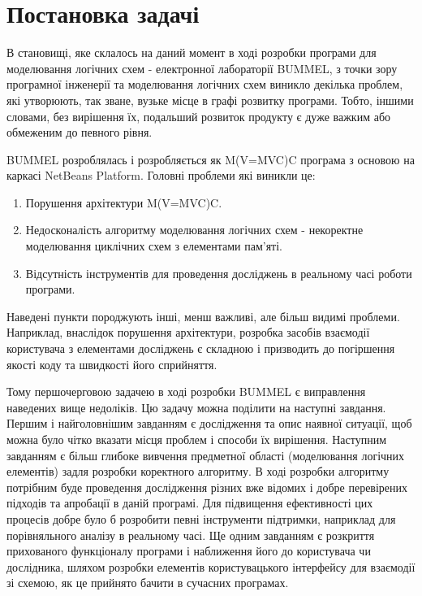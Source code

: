 \documentclass[12pt,a4paper]{article}
\begin{document}
\clearpage

\section{Постановка задачі}

В становищі, яке склалось на даний момент в ході розробки програми для моделювання логічних схем - електронної лабораторії BUMMEL, з точки зору програмної інженерії та моделювання логічних схем виникло декілька проблем, які утворюють, так зване, вузьке місце в графі розвитку програми. Тобто, іншими словами, без вирішення їх, подальший розвиток продукту є дуже важким або обмеженим до певного рівня.

BUMMEL розроблялась і розробляється як M(V=MVC)C програма з основою на каркасі NetBeans Platform. Головні проблеми які виникли це:
\begin{enumerate}
  \item Порушення архітектури M(V=MVC)C.
  \item Недосконалість алгоритму моделювання логічних схем - некоректне моделювання циклічних схем з елементами пам’яті.
  \item Відсутність інструментів для проведення досліджень в реальному часі роботи програми.
\end{enumerate}

Наведені пункти породжують інші, менш важливі, але більш видимі проблеми. Наприклад, внаслідок порушення архітектури, розробка засобів взаємодії користувача з елементами досліджень є складною і призводить до погіршення якості коду та швидкості його сприйняття.

Тому першочерговою задачею в ході розробки BUMMEL є виправлення наведених вище недоліків. Цю задачу можна поділити на наступні завдання. Першим і найголовнішим завданням є дослідження та опис наявної ситуації, щоб можна було чітко вказати місця проблем і способи їх вирішення. Наступним завданням є більш глибоке вивчення предметної області (моделювання логічних елементів) задля розробки коректного алгоритму. В ході розробки алгоритму потрібним буде проведення дослідження різних вже відомих і добре перевірених підходів та апробації в даній програмі. Для підвищення ефективності цих процесів добре було б розробити певні інструменти підтримки, наприклад для порівняльного аналізу в реальному часі. Ще одним завданням є розкриття прихованого функціоналу програми і наближення його до користувача чи дослідника, шляхом розробки елементів користувацького інтерфейсу для взаємодії зі схемою, як це прийнято бачити в сучасних програмах.
\end{document}
